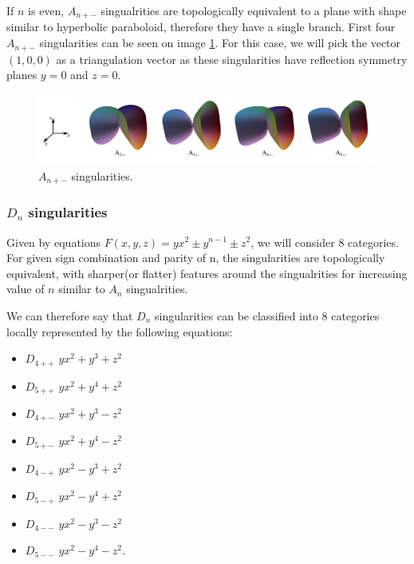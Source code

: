 If $n$ is even, $A_{n+-}$ singualrities are topologically equivalent to a plane
with shape similar to hyperbolic paraboloid, therefore they have a single branch.
First four $A_{n+-}$ singularities can be seen on image \ref{img:5}.
For this case, we will pick the vector $(1, 0, 0)$ as a triangulation vector as
these singularities have reflection symmetry planes $y=0$ and $z=0$.

\begin{figure}
    \centerline{\includegraphics[width=1\textwidth]{images/img5}}
    \caption[$A_{n+-}$ singularities]
    {$A_{n+-}$ singularities. \cite{singsurf}}
    \label{img:5}
\end{figure}

\subsubsection*{$D_n$ singularities}

Given by equations $F(x,y,z)=yx^2\pm y^{n-1}\pm z^2$, we will consider 8 categories.
For given sign combination and parity of n, the singularities are topologically
equivalent, with sharper(or flatter) features around the singualrities for increasing
value of $n$ similar to $A_n$ singualrities.

We can therefore say that $D_n$ singularities can be classified into 8 categories
locally represented by the following equations:
\begin{itemize}
    \item $D_{4++}$ \hspace{5mm} $yx^2 + y^3 + z^2$
    \item $D_{5++}$ \hspace{5mm} $yx^2 + y^4 + z^2$
    \item $D_{4+-}$ \hspace{5mm} $yx^2 + y^3 - z^2$
    \item $D_{5+-}$ \hspace{5mm} $yx^2 + y^4 - z^2$
    \item $D_{4-+}$ \hspace{5mm} $yx^2 - y^3 + z^2$
    \item $D_{5-+}$ \hspace{5mm} $yx^2 - y^4 + z^2$
    \item $D_{4--}$ \hspace{5mm} $yx^2 - y^3 - z^2$
    \item $D_{5--}$ \hspace{5mm} $yx^2 - y^4 - z^2$.
\end{itemize}

